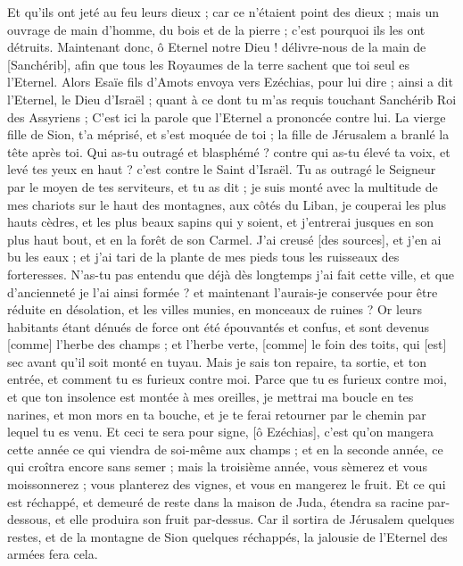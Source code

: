 \begin{multicols}{2}
Et qu'ils ont jeté au feu leurs dieux ; car ce n'étaient point des dieux ; mais un ouvrage de main d'homme, du bois et de la pierre ; c'est pourquoi ils les ont détruits.
Maintenant donc, ô Eternel notre Dieu ! délivre-nous de la main de [Sanchérib], afin que tous les Royaumes de la terre sachent que toi seul es l'Eternel.
Alors Esaïe fils d'Amots envoya vers Ezéchias, pour lui dire ; ainsi a dit l'Eternel, le Dieu d'Israël ; quant à ce dont tu m'as requis touchant Sanchérib Roi des Assyriens ;
C'est ici la parole que l'Eternel a prononcée contre lui. La vierge fille de Sion, t'a méprisé, et s'est moquée de toi ; la fille de Jérusalem a branlé la tête après toi.
Qui as-tu outragé et blasphémé ? contre qui as-tu élevé ta voix, et levé tes yeux en haut ? c'est contre le Saint d'Israël.
Tu as outragé le Seigneur par le moyen de tes serviteurs, et tu as dit ; je suis monté avec la multitude de mes chariots sur le haut des montagnes, aux côtés du Liban, je couperai les plus hauts cèdres, et les plus beaux sapins qui y soient, et j'entrerai jusques en son plus haut bout, et en la forêt de son Carmel.
J'ai creusé [des sources], et j'en ai bu les eaux ; et j'ai tari de la plante de mes pieds tous les ruisseaux des forteresses.
N'as-tu pas entendu que déjà dès longtemps j'ai fait cette ville, et que d'ancienneté je l'ai ainsi formée ? et maintenant l'aurais-je conservée pour être réduite en désolation, et les villes munies, en monceaux de ruines ?
Or leurs habitants étant dénués de force ont été épouvantés et confus, et sont devenus [comme] l'herbe des champs ; et l'herbe verte, [comme] le foin des toits, qui [est] sec avant qu'il soit monté en tuyau.
Mais je sais ton repaire, ta sortie, et ton entrée, et comment tu es furieux contre moi.
Parce que tu es furieux contre moi, et que ton insolence est montée à mes oreilles, je mettrai ma boucle en tes narines, et mon mors en ta bouche, et je te ferai retourner par le chemin par lequel tu es venu.
Et ceci te sera pour signe, [ô Ezéchias], c'est qu'on mangera cette année ce qui viendra de soi-même aux champs ; et en la seconde année, ce qui croîtra encore sans semer ; mais la troisième année, vous sèmerez et vous moissonnerez ; vous planterez des vignes, et vous en mangerez le fruit.
Et ce qui est réchappé, et demeuré de reste dans la maison de Juda, étendra sa racine par-dessous, et elle produira son fruit par-dessus.
Car il sortira de Jérusalem quelques restes, et de la montagne de Sion quelques réchappés, la jalousie de l'Eternel des armées fera cela.

\end{multicols}
